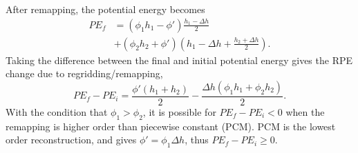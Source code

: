 After remapping, the potential energy becomes
%
\begin{equation}
  \begin{split}
    PE_f &= \left(\phi_1 h_1 - \phi'\right)\frac{h_1 - \Delta h}{2} \\
    &+ \left(\phi_2 h_2 + \phi'\right)\left(h_1 - \Delta h + \frac{h_2 + \Delta h}{2}\right).
  \end{split}
\end{equation}
%
Taking the difference between the final and initial potential energy gives the RPE change due to regridding/remapping,
%
\begin{equation}
  PE_f - PE_i = \frac{\phi'\left(h_1 + h_2\right)}{2} - \frac{\Delta h\left(\phi_1 h_1 + \phi_2 h_2\right)}{2}.
\end{equation}
%
With the condition that $\phi_1 > \phi_2$, it is possible for $PE_f - PE_i < 0$ when the remapping is higher order than piecewise constant (PCM). PCM is the lowest order reconstruction, and gives $\phi' = \phi_1 \Delta h$, thus $PE_f - PE_i \ge 0$.
